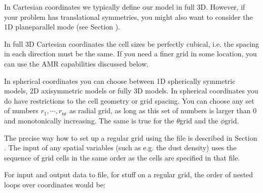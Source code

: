 \documentclass[letterpaper,10pt,english]{sphinxmanual}
\begin{document}
In Cartesian coordinates we typically define our model in full 3\sphinxhyphen{}D.
However, if your problem has translational symmetries, you might also want
to consider the 1\sphinxhyphen{}D plane\sphinxhyphen{}parallel mode (see Section
{\hyperref[\detokenize{gridding:sec-1d-plane-parallel}]{}}).

In full 3\sphinxhyphen{}D Cartesian coordinates the cell sizes  be perfectly
cubical, i.e. the spacing in each direction must be the same. If you need a
finer grid in some location, you can use the AMR capabilities discussed
below.

In spherical coordinates you can choose between 1\sphinxhyphen{}D spherically symmetric
models, 2\sphinxhyphen{}D axisymmetric models or fully 3\sphinxhyphen{}D models. In spherical coordinates
you do  have restrictions to the cell geometry or grid spacing.
You can choose any set of numbers \(r_1,\cdots,r_{\mathrm{nr}}\) as radial
grid, as long as this set of numbers is larger than 0 and monotonically
increasing. The same is true for the \(\theta\)\sphinxhyphen{}grid and the \(\phi\)\sphinxhyphen{}grid.

The precise way how to set up a regular grid using the  file is
described in Section {\hyperref[\detokenize{inputoutputfiles:sec-amr-grid-regular}]{}}.  The input of any spatial
variables (such as e.g. the dust density) uses the sequence of grid cells in
the same order as the cells are specified in that  file.

For input and output data to file, for stuff on a regular grid, the order of
nested loops over coordinates would be:

\begin{sphinxVerbatim}[commandchars=\\\{\}]
 
    
       
               
\end{sphinxVerbatim}
\end{document}

